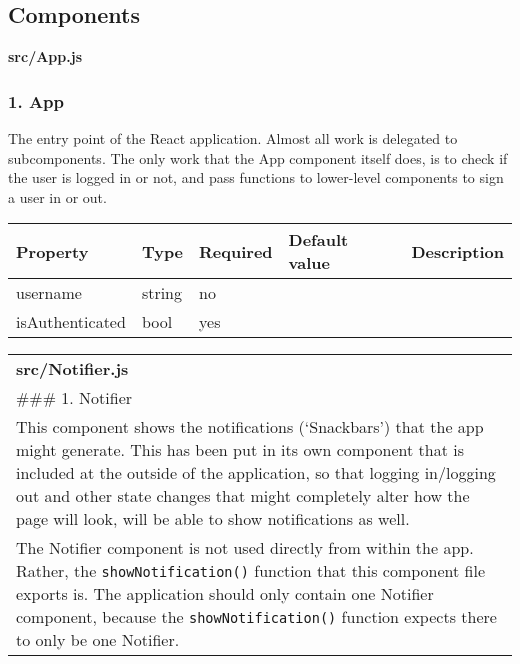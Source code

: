 \hypertarget{components}{%
\subsection{Components}\label{components}}

\textbf{src/App.js}

\hypertarget{app}{%
\subsubsection{1. App}\label{app}}

The entry point of the React application. Almost all work is delegated
to subcomponents. The only work that the App component itself does, is
to check if the user is logged in or not, and pass functions to
lower-level components to sign a user in or out.

\begin{longtable}[]{@{}lllll@{}}
\toprule
Property & Type & Required & Default value & Description\tabularnewline
\midrule
\endhead
username & string & no & &\tabularnewline
isAuthenticated & bool & yes & &\tabularnewline
\bottomrule
\end{longtable}

\begin{longtable}[]{@{}l@{}}
\toprule
\endhead
\begin{minipage}[t]{0.08\columnwidth}\raggedright
\textbf{src/Notifier.js}\strut
\end{minipage}\tabularnewline
\begin{minipage}[t]{0.08\columnwidth}\raggedright
\#\#\# 1. Notifier\strut
\end{minipage}\tabularnewline
\begin{minipage}[t]{0.08\columnwidth}\raggedright
This component shows the notifications (`Snackbars') that the app might
generate. This has been put in its own component that is included at the
outside of the application, so that logging in/logging out and other
state changes that might completely alter how the page will look, will
be able to show notifications as well.\strut
\end{minipage}\tabularnewline
\begin{minipage}[t]{0.08\columnwidth}\raggedright
The Notifier component is not used directly from within the app. Rather,
the \texttt{showNotification()} function that this component file
exports is. The application should only contain one Notifier component,
because the \texttt{showNotification()} function expects there to only
be one Notifier.\strut
\end{minipage}\tabularnewline
\bottomrule
\end{longtable}

